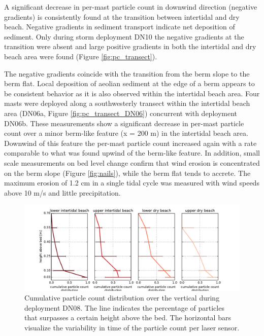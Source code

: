 A significant decrease in per-mast particle count in downwind
direction (negative gradients) is consistently found at the transition
between intertidal and dry beach. Negative gradients in sediment
transport indicate net deposition of sediment. Only during storm
deployment DN10 the negative gradients at the transition were absent
and large positive gradients in both the intertidal and dry beach area
were found (Figure \ref{fig:pc_transect}).

The negative gradients coincide with the transition from the berm
slope to the berm flat. Local deposition of aeolian sediment at the
edge of a berm appears to be consistent behavior as it is also
observed within the intertidal beach area. Four masts were deployed
along a southwesterly transect within the intertidal beach area
(DN06a, Figure \ref{fig:pc_transect_DN06}) concurrent with deployment
DN06b. These measurements show a significant decrease in per-mast
particle count over a minor berm-like feature (x = 200 m) in the
intertidal beach area. Downwind of this feature the per-mast particle
count increased again with a rate comparable to what was found upwind
of the berm-like feature. In addition, small scale measurements on bed
level change confirm that wind erosion is concentrated on the berm
slope (Figure \ref{fig:nails}), while the berm flat tends to
accrete. The maximum erosion of 1.2 cm in a single tidal cycle was
measured with wind speeds above 10 m/s and little precipitation.

\begin{figure}
 \centering
  \includegraphics[width=\columnwidth]{../Figures/particlecounts_distheight}
  \caption{Cumulative particle count distribution over the vertical
    during deployment DN08. The line indicates the percentage of
    particles that surpasses a certain height above the bed. The
    horizontal bars visualize the variability in time of the particle
    count per laser sensor.}
  \label{fig:pc_distheight}
\end{figure}

